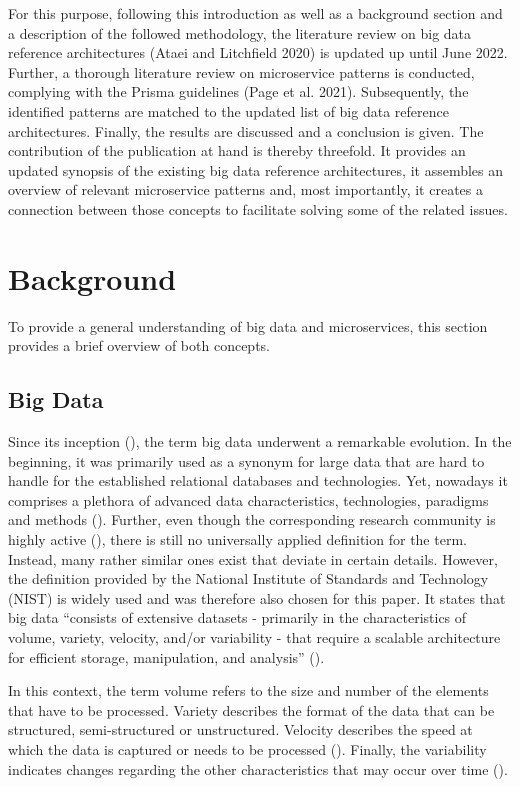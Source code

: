 \documentclass[conference]{IEEEtran}
\begin{document}
For this purpose, following this introduction as well as a background section and a description of the followed methodology, the literature review on big data reference architectures (Ataei and Litchfield 2020) is updated up until June 2022. Further, a thorough literature review on microservice patterns is conducted, complying with the Prisma guidelines (Page et al. 2021). Subsequently, the identified patterns are matched to the updated list of big data reference architectures. Finally, the results are discussed and a conclusion is given.
The contribution of the publication at hand is thereby threefold. It provides an updated synopsis of the existing big data reference architectures, it assembles an overview of relevant microservice patterns and, most importantly, it creates a connection between those concepts to facilitate solving some of the related issues.


\section{Background}

To provide a general understanding of big data and microservices, this section provides a brief overview of both concepts.

\subsection{Big Data}

Since its inception (\cite{Diebold.2012}), the term big data underwent a remarkable evolution. In the beginning, it was primarily used as a synonym for large data that are hard to handle for the established relational databases and technologies. Yet, nowadays it comprises a plethora of advanced data characteristics, technologies, paradigms and methods (\cite{Volk.2020b}). Further, even though the corresponding research community is highly active (\cite{Parlina.2020}), there is still no universally applied definition for the term. Instead, many rather similar ones exist that deviate in certain details. However, the definition provided by the National Institute of Standards and Technology (NIST) is widely used and was therefore also chosen for this paper. It states that big data “consists of extensive datasets - primarily in the characteristics of volume, variety, velocity, and/or variability - that require a scalable architecture for efficient storage, manipulation, and analysis” (\cite{Chang.2019}).

In this context, the term volume refers to the size and number of the elements that have to be processed. Variety describes the format of the data that can be structured, semi-structured or unstructured. Velocity describes the speed at which the data is captured or needs to be processed (\cite{Gandomi.2015}). Finally, the variability indicates changes regarding the other characteristics that may occur over time (\cite{Chang.2019}).
\end{document}
